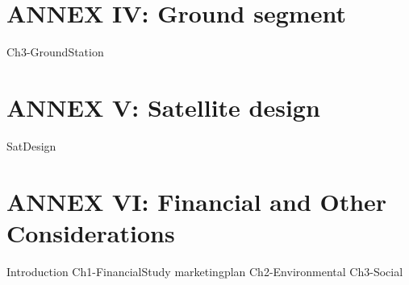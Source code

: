 \part{ANNEX IV: Ground segment}
{Ch3-GroundStation}

\part{ANNEX V: Satellite design}
{SatDesign}

\part{ANNEX VI: Financial and Other Considerations}
{Introduction}
{Ch1-FinancialStudy}
{marketingplan}
{Ch2-Environmental}
{Ch3-Social}






 

